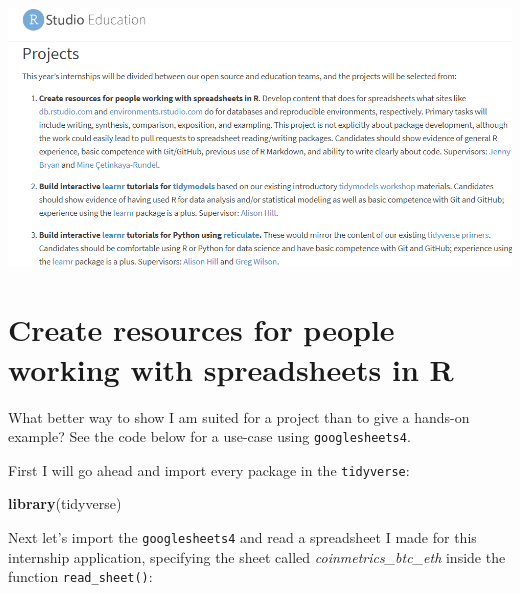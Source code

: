 \documentclass[
]{book}
\newenvironment{Shaded}{\begin{snugshade}}{\end{snugshade}}
\newcommand{\DataTypeTok}[1]{\textcolor[rgb]{0.13,0.29,0.53}{#1}}
\newcommand{\KeywordTok}[1]{\textcolor[rgb]{0.13,0.29,0.53}{\textbf{#1}}}
\newcommand{\NormalTok}[1]{#1}
\newcommand{\OperatorTok}[1]{\textcolor[rgb]{0.81,0.36,0.00}{\textbf{#1}}}
\newcommand{\StringTok}[1]{\textcolor[rgb]{0.31,0.60,0.02}{#1}}
\begin{document}
\includegraphics{images/projects_list.png}

\hypertarget{create-resources-for-people-working-with-spreadsheets-in-r}{%
\section{Create resources for people working with spreadsheets in R}\label{create-resources-for-people-working-with-spreadsheets-in-r}}

What better way to show I am suited for a project than to give a hands-on example? See the code below for a use-case using \texttt{googlesheets4}\citep{R-googlesheets4}.

First I will go ahead and import every package in the \texttt{tidyverse}\citep{R-tidyverse}:

\begin{Shaded}
\begin{Highlighting}[]
\KeywordTok{library}\NormalTok{(tidyverse)}
\end{Highlighting}
\end{Shaded}

Next let's import the \texttt{googlesheets4} and read a spreadsheet I made for this internship application, specifying the sheet called \emph{coinmetrics\_btc\_eth} inside the function \texttt{read\_sheet()}:

\begin{Shaded}
\end{Shaded}
\end{document}
